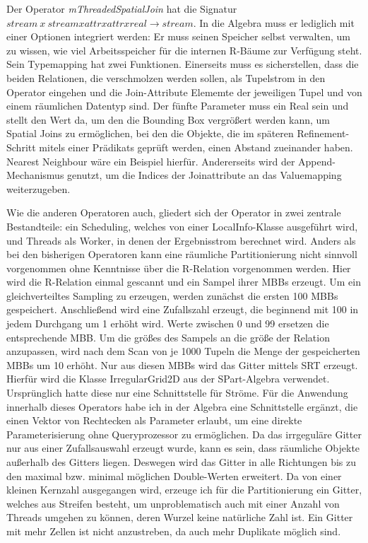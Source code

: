 \documentclass[a4paper,12pt,twoside]{article}
\newcommand{\Fb}[1]{\textit{#1}} %
\begin{document}
Der Operator \Fb{mThreadedSpatialJoin} hat die Signatur $stream~x~stream x attr x attr x real \longrightarrow stream$. In die Algebra muss er lediglich mit einer Optionen integriert werden: Er muss seinen Speicher selbst verwalten, um zu wissen, wie viel Arbeitsspeicher für die internen R-Bäume zur Verfügung steht. Sein Typemapping hat zwei Funktionen. Einerseits muss es sicherstellen, dass die beiden Relationen, die verschmolzen werden sollen, als Tupelstrom in den Operator eingehen und die Join-Attribute Elememte der jeweiligen Tupel und von einem räumlichen Datentyp sind. Der fünfte Parameter muss ein Real sein und stellt den Wert da, um den die Bounding Box vergrößert werden kann, um Spatial Joins zu ermöglichen, bei den die Objekte, die im späteren Refinement-Schritt mitels einer Prädikats geprüft werden, einen Abstand zueinander haben. Nearest Neighbour wäre ein Beispiel hierfür. Andererseits wird der Append-Mechanismus genutzt, um die Indices der Joinattribute an das Valuemapping weiterzugeben.

Wie die anderen Operatoren auch, gliedert sich der Operator in zwei zentrale Bestandteile: ein Scheduling, welches von einer LocalInfo-Klasse ausgeführt wird, und Threads als Worker, in denen der Ergebnisstrom berechnet wird. Anders als bei den bisherigen Operatoren kann eine räumliche Partitionierung nicht sinnvoll vorgenommen ohne Kenntnisse über die R-Relation vorgenommen werden. Hier wird die R-Relation einmal gescannt und ein Sampel ihrer MBBs erzeugt. Um ein gleichverteiltes Sampling zu erzeugen, werden zunächst die ersten 100 MBBs gespeichert. Anschließend wird eine Zufallszahl erzeugt, die beginnend mit 100 in jedem Durchgang um 1 erhöht wird. Werte zwischen 0 und 99 ersetzen die entsprechende MBB. Um die größes des Sampels an die größe der Relation anzupassen, wird nach dem Scan von je 1000 Tupeln die Menge der gespeicherten MBBs um 10 erhöht. Nur aus diesen MBBs wird das Gitter mittels SRT erzeugt. Hierfür wird die Klasse IrregularGrid2D aus der SPart-Algebra verwendet. Ursprünglich hatte diese nur eine Schnittstelle für Ströme. Für die Anwendung innerhalb dieses Operators habe ich in der Algebra eine Schnittstelle ergänzt, die einen Vektor von Rechtecken als Parameter erlaubt, um eine direkte Parameterisierung ohne Queryprozessor zu ermöglichen. Da das irrgeguläre Gitter nur aus einer Zufallsauswahl erzeugt wurde, kann es sein, dass räumliche Objekte außerhalb des Gitters liegen. Deswegen wird das Gitter in alle Richtungen bis zu den maximal bzw. minimal möglichen Double-Werten erweitert. Da von einer kleinen Kernzahl ausgegangen wird, erzeuge ich für die Partitionierung ein Gitter, welches aus Streifen besteht, um unproblematisch auch mit einer Anzahl von Threads umgehen zu können, deren Wurzel keine natürliche Zahl ist. Ein Gitter mit mehr Zellen ist nicht anzustreben, da auch mehr Duplikate möglich sind.
\end{document}
